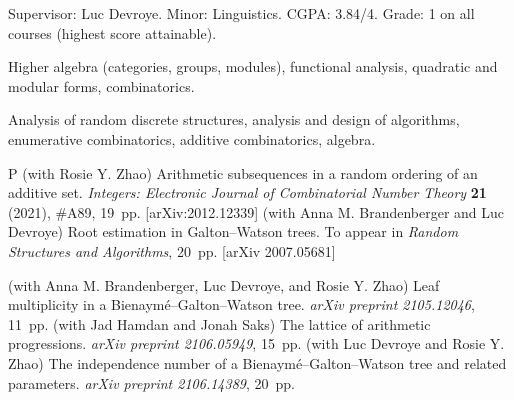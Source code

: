 


\smallskip
Supervisor: Luc Devroye.
\medbreak
{}
\smallskip
Minor: Linguistics. CGPA: 3.84/4.
\medbreak
{}
\smallskip
Grade: 1 on all courses (highest score attainable).


\smallskip
{}
\smallskip
{}


Higher algebra (categories, groups, modules), functional analysis, quadratic and modular forms, combinatorics.


Analysis of random discrete structures, analysis and design of algorithms, enumerative combinatorics,
additive combinatorics, algebra.


\pubbegin P
\papitem (with Rosie Y. Zhao)
Arithmetic subsequences in a random ordering of an additive set.
{\sl Integers: Electronic Journal of Combinatorial Number Theory} {\bf 21} (2021), \#A89, 19~pp.
[arXiv:2012.12339]
\papitem (with Anna M. Brandenberger and Luc Devroye)
Root estimation in Galton--Watson trees. To appear in {\sl Random Structures and Algorithms}, 20~pp.
[arXiv 2007.05681]



\begingroup\parindent=10pt
\smallskip
\thing (with Anna M. Brandenberger, Luc Devroye, and Rosie Y. Zhao)
Leaf multiplicity in a Bienaym\'e--Galton--Watson tree. {\sl arXiv preprint 2105.12046}, 11~pp.
\smallskip
\thing (with Jad Hamdan and Jonah Saks)
The lattice of arithmetic progressions. {\sl arXiv preprint 2106.05949}, 15~pp.
\smallskip
\thing (with Luc Devroye and Rosie Y. Zhao)
The independence number of a Bienaym\'e--Galton--Watson tree
and related parameters. {\sl arXiv preprint 2106.14389}, 20~pp.
\endgroup

